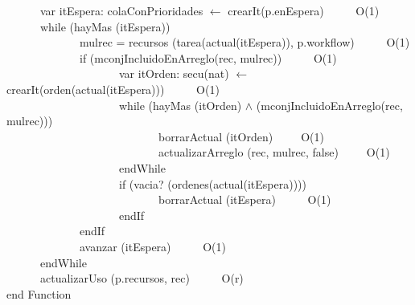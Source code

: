 \documentclass[a4paper,10pt]{article}
\begin{document}
\begin{algoritmo}
	\indent \ \ \ \ \ \ var itEspera: colaConPrioridades $\gets$ crearIt(p.enEspera) \ \ \ \ \ O(1)\\
	\indent \ \ \ \ \ \ while (hayMas (itEspera))   \ \ \ \ \ \\
	\indent \ \ \ \ \ \ \ \ \ \ \ \ \ mulrec = recursos (tarea(actual(itEspera)), p.workflow) \ \ \ \ \ O(1)\\
	\indent \ \ \ \ \ \ \ \ \ \ \ \ \ if (mconjIncluidoEnArreglo(rec, mulrec)) \ \ \ \ \ O(1)\\
	\indent \ \ \ \ \ \ \ \ \ \ \ \ \ \ \ \ \ \ \ \ var itOrden: secu(nat) $\gets$ crearIt(orden(actual(itEspera)))  \ \ \ \ \ O(1)\\
	\indent \ \ \ \ \ \ \ \ \ \ \ \ \ \ \ \ \ \ \ \ while (hayMas (itOrden) $\wedge$ (mconjIncluidoEnArreglo(rec, mulrec))) \\
	\indent \ \ \ \ \ \ \ \ \ \ \ \ \ \ \ \ \ \ \ \ \ \ \ \ \ \ \ borrarActual (itOrden)\ \ \ \ \ O(1)\\
	\indent \ \ \ \ \ \ \ \ \ \ \ \ \ \ \ \ \ \ \ \ \ \ \ \ \ \ \ actualizarArreglo (rec, mulrec, false)\ \ \ \ \ O(1)\\
	\indent \ \ \ \ \ \ \ \ \ \ \ \ \ \ \ \ \ \ \ \ endWhile \\
	\indent \ \ \ \ \ \ \ \ \ \ \ \ \ \ \ \ \ \ \ \ if (vacia? (ordenes(actual(itEspera))))\\
	\indent \ \ \ \ \ \ \ \ \ \ \ \ \ \ \ \ \ \ \ \ \ \ \ \ \ \ \ borrarActual (itEspera) \ \ \ \ \ O(1)\\
	\indent \ \ \ \ \ \ \ \ \ \ \ \ \ \ \ \ \ \ \ \ endIf \\
	\indent \ \ \ \ \ \ \ \ \ \ \ \ \ endIf \\
	\indent \ \ \ \ \ \ \ \ \ \ \ \ \ avanzar (itEspera) \ \ \ \ \ O(1)\\
	\indent \ \ \ \ \ \ endWhile \ \ \ \ \ \\
	\indent \ \ \ \ \ \ actualizarUso (p.recursos, rec) \ \ \ \ \ O(r) \\
  end Function \\


\end{algoritmo}
\end{document}

